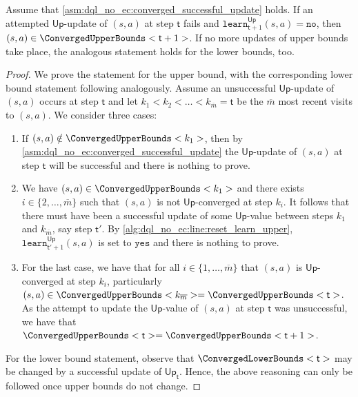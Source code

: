 \documentclass{article}
\newcommand{\upperbound}{\mathsf{Up}}
\newcommand{\delay}{{\overline{m}}}
\newcommand{\learn}{\texttt{learn}}
\newcommand{\learnyes}{\texttt{yes}}
\newcommand{\learnno}{\texttt{no}}
\newcommand{\algostep}{\mathsf{t}}
\begin{document}
\begin{lemma} \label{stm:dql_no_ec:unsuccessful_update_means_converged}
	Assume that \cref{asm:dql_no_ec:converged_successful_update} holds.
	If an attempted $\upperbound$-update of $(s, a)$ at step $\algostep$ fails and $\learn^\upperbound_{\algostep+1}(s, a) = \learnno$, then $(s, a) \in \ConvergedUpperBounds<\algostep+1>$.
	If no more updates of upper bounds take place, the analogous statement holds for the lower bounds, too.
\end{lemma}

\begin{proof}
	We prove the statement for the upper bound, with the corresponding lower bound statement following analogously.
	Assume an unsuccessful $\upperbound$-update of $(s, a)$ occurs at step $\algostep$ and let $k_1 < k_2 < \ldots < k_\delay = \algostep$ be the $\delay$ most recent visits to $(s, a)$.
	We consider three cases:
	\begin{enumerate}
		\item
		If $(s, a) \notin \ConvergedUpperBounds<k_1>$, then by \cref{asm:dql_no_ec:converged_successful_update} the $\upperbound$-update of $(s, a)$ at step $\algostep$ will be successful and there is nothing to prove.

		\item
		We have $(s, a) \in \ConvergedUpperBounds<k_1>$ and there exists $i \in \{2, \ldots, \delay\}$ such that $(s, a)$ is not $\upperbound$-converged at step $k_i$.
		It follows that there must have been a successful update of some $\upperbound$-value between steps $k_1$ and $k_\delay$, say step $\algostep'$.
		By \cref{alg:dql_no_ec:line:reset_learn_upper}, $\learn_{\algostep' + 1}^\upperbound(s, a)$ is set to $\learnyes$ and there is nothing to prove.

		\item
		For the last case, we have that for all $i \in \{1, \ldots, \delay\}$ that $(s, a)$ is $\upperbound$-converged at step $k_i$, particularly $(s, a) \in \ConvergedUpperBounds<k_{\delay}> = \ConvergedUpperBounds<\algostep>$.
		As the attempt to update the $\upperbound$-value of $(s, a)$ at step $\algostep$ was unsuccessful, we have that $\ConvergedUpperBounds<\algostep> = \ConvergedUpperBounds<\algostep+1>$.
	\end{enumerate}
	For the lower bound statement, observe that $\ConvergedLowerBounds<\algostep>$ may be changed by a successful update of $\upperbound_\algostep$.
	Hence, the above reasoning can only be followed once upper bounds do not change. 
\end{proof}
\end{document}

